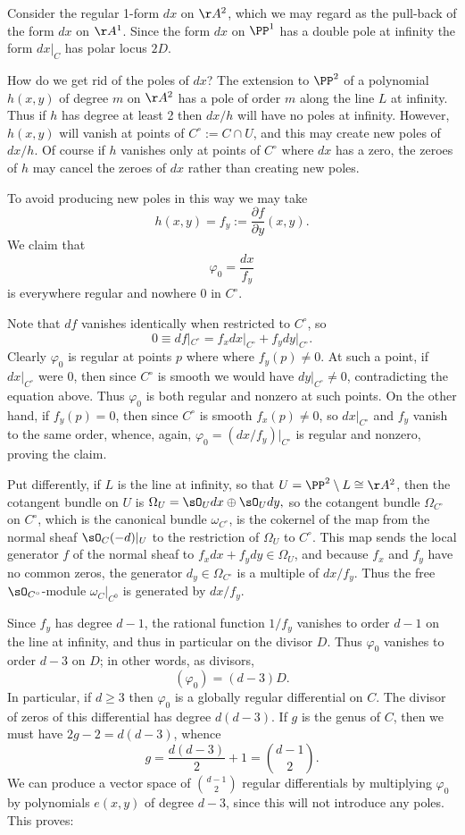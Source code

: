 Consider the
regular 1-form $dx$ on $\AA^2$, which we may regard as the pull-back of the form $dx$ on
 $\AA^{1}$.
Since the form $dx$ on $\PP^{1}$ has a double pole at infinity the form $dx|_{C}$ has polar
locus $2D$.
 
 \def\Co{{C^{\circ}}}
How do we get rid of the poles of $dx$? The extension to $\PP^2$ of a polynomial $h(x,y)$ of degree $m$ on
$\AA^2$ has a pole of order $m$ along the line $L$ at infinity. Thus if $h$ has degree at least 2 then $dx/h$ will have no poles at infinity. However, $h(x,y)$ will vanish at points of $\Co :=C \cap U$, and this may create new poles of $dx/h$. Of course if $h$ vanishes only at  points of $\Co$ where $dx$ has a zero, the zeroes of $h$ may cancel the zeroes of $dx$ rather than creating new poles.
 
 To avoid producing new poles in this way we may take
 $$
 h(x,y) = f_{y} := \frac{\partial f}{\partial y}(x,y).
 $$
 We claim that 
 $$
\varphi_0 = \frac{dx}{f_{y}}
$$
is everywhere regular and nowhere 0 in $C^\circ$. 

Note that $df$ vanishes identically when restricted to $C^\circ$, so
 $$
 0 \equiv df|_{\Co} = f_{x}dx|_{\Co} + f_{y}dy|_{\Co} .
 $$
Clearly $\varphi_0$ is regular at points $p$ where
where $f_{y}(p) \neq 0$. At such a point, if $dx|_{\Co}$ were 0, then since $\Co$ is smooth we would have $dy|_{\Co} \neq 0$, contradicting the equation above. Thus $\varphi_{0}$ is both regular and nonzero at such points. On the other hand, if $f_{y}(p) = 0$, then since $\Co$ is smooth $f_{x}(p) \neq 0$, so $dx|_{\Co}$ and $f_{y}$ vanish to the same
order, whence, again, $\varphi_0 = (dx/f_{y})|_{\Co}$ is regular and nonzero, proving the claim.

Put differently, if $L$ is the line at infinity, so that $U = \PP^{2}\setminus L \cong \AA^{2}$,
then the cotangent bundle on $U$ is 
$\Omega_{U}=\sO_{U}dx \oplus \sO_{U}dy,$
so 
the cotangent bundle $\Omega_{\Co}$ on $C^{\circ}$, which is the canonical bundle $\omega_{\Co}$,
 is the cokernel of the map from the normal sheaf $\sO_{C}(-d)|_{U}$ to the restriction of 
$\Omega_{U}$ to $C^{\circ}$. This map sends the local generator $f$ of the normal sheaf to
$f_{x}dx+f_{y}dy \in \Omega_{U}$, and because $f_{x}$ and $f_{y}$ have no common zeros, the generator $d_{y} \in \Omega_{C^{\circ}}$ is a multiple of $dx/f_{y}$.
Thus the free $\sO_{C^{\circ}}$-module $\omega_{C}|_{C^{0}}$ is generated by $dx/f_{y}$.

Since $f_{y}$ has degree $d-1$, the rational function $1/f_{y}$ vanishes to order $d-1$ on the line
at infinity, and thus in particular on the divisor $D$. Thus $\varphi_0$ vanishes to order $d-3$ on $D$; in other words, as divisors,
$$
(\varphi_0) = (d-3)D.
$$
In particular, if $d \geq 3$ then $\varphi_0$ is a globally regular differential on $C$. The divisor of
zeros of this differential has degree $d(d-3)$. If $g$ is the genus of $C$, then we must
have $2g-2 = d(d-3)$, whence 
$$
g = \frac{d(d-3)}{2} + 1 = \binom{d-1}{2}.
$$
We can produce a vector space of $\binom{d-1}{2}$ regular differentials by multiplying $\varphi_0$ by 
polynomials $e(x,y)$ 
  of degree $d-3$, since this will not introduce any poles. This proves:

